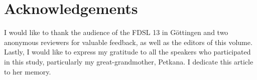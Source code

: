 \documentclass[output=paper,
colorlinks,
citecolor=brown,
newtxmath
]{langscibook}
\begin{document}

\section*{Acknowledgements}

I would like to thank the audience of the FDSL 13 in Göttingen and two anonymous reviewers for valuable feedback, as well as the editors of this volume. Lastly, I would like to express my gratitude to all the speakers who participated in this study, particularly my great-grandmother, Petkana. I dedicate this article to her memory.

\sloppy
\printbibliography[heading=subbibliography,notkeyword=this]
\end{document}
